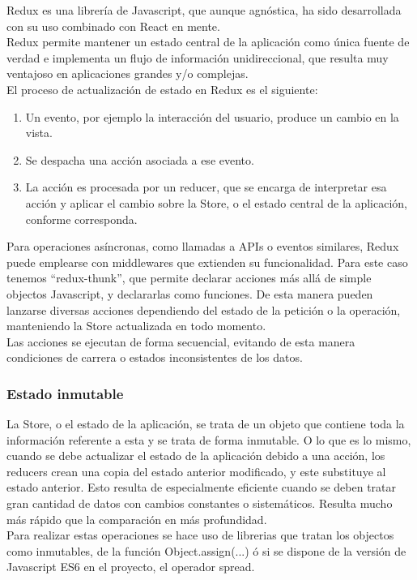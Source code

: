 Redux es una librería de Javascript, que aunque agnóstica, ha sido desarrollada con su uso combinado con React en mente. \\ 

Redux permite mantener un estado central de la aplicación como única fuente de verdad e implementa un flujo de información unidireccional, que resulta muy ventajoso en aplicaciones grandes y/o complejas. \\

El proceso de actualización de estado en Redux es el siguiente: 

\begin{enumerate}  
	\item  Un evento, por ejemplo la interacción del usuario, produce un cambio en la vista.
	\item Se despacha una acción asociada a ese evento. 
	\item La acción es procesada por un reducer, que se encarga de interpretar esa acción y aplicar el cambio sobre la Store, o el estado central de la aplicación, conforme corresponda.
\end{enumerate}

Para operaciones asíncronas, como llamadas a APIs o eventos similares, Redux puede emplearse con middlewares que extienden su funcionalidad. Para este caso tenemos \hyphenquote{spanish}{redux-thunk}, que permite declarar acciones más allá de simple objectos Javascript, y declararlas como funciones. De esta manera pueden lanzarse diversas acciones dependiendo del estado de la petición o la operación, manteniendo la Store actualizada en todo momento. \\

Las acciones se ejecutan de forma secuencial, evitando de esta manera condiciones de carrera o estados inconsistentes de los datos. \\

\subsubsection {Estado inmutable}

La Store, o el estado de la aplicación, se trata de un objeto que contiene toda la información referente a esta y se trata de forma inmutable. O lo que es lo mismo, cuando se debe actualizar el estado de la aplicación debido a una acción, los reducers crean una copia del estado anterior modificado, y este substituye al estado anterior. Esto resulta de especialmente eficiente cuando se deben tratar gran cantidad de datos con cambios constantes o sistemáticos. Resulta mucho más rápido que la comparación en más profundidad. \\

Para realizar estas operaciones se hace uso de librerias que tratan los objectos como inmutables, de la función Object.assign(...) ó si se dispone de la versión de Javascript ES6 en el proyecto, el operador spread. \\

